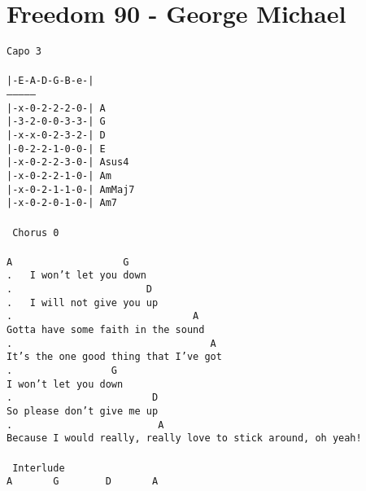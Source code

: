 \newpage
\section{Freedom 90 - George Michael}
\label{Freedom 90 - George Michael}
\texttt{Capo 3\\
\\
|-E-A-D-G-B-e-|\\
---------------\\
|-x-0-2-2-2-0-|\ A\\
|-3-2-0-0-3-3-|\ G\\
|-x-x-0-2-3-2-|\ D\\
|-0-2-2-1-0-0-|\ E\\
|-x-0-2-2-3-0-|\ Asus4\\
|-x-0-2-2-1-0-|\ Am\\
|-x-0-2-1-1-0-|\ AmMaj7\\
|-x-0-2-0-1-0-|\ Am7\\
\\
\lbrack\ Chorus\ 0\rbrack\\
\\
A\ \ \ \ \ \ \ \ \ \ \ \ \ \ \ \ \ \ \ G\\
. \ \ I\ won't\ let\ you\ down\\
. \ \ \ \ \ \ \ \ \ \ \ \ \ \ \ \ \ \ \ \ \ \ D\\
. \ \ I\ will\ not\ give\ you\ up\\
. \ \ \ \ \ \ \ \ \ \ \ \ \ \ \ \ \ \ \ \ \ \ \ \ \ \ \ \ \ \ A\\
Gotta\ have\ some\ faith\ in\ the\ sound\\
. \ \ \ \ \ \ \ \ \ \ \ \ \ \ \ \ \ \ \ \ \ \ \ \ \ \ \ \ \ \ \ \ \ A\ \ \\
It's\ the\ one\ good\ thing\ that\ I've\ got\\
. \ \ \ \ \ \ \ \ \ \ \ \ \ \ \ \ G\ \\
I\ won't\ let\ you\ down\\
. \ \ \ \ \ \ \ \ \ \ \ \ \ \ \ \ \ \ \ \ \ \ \ D\\
So\ please\ don't\ give\ me\ up\\
. \ \ \ \ \ \ \ \ \ \ \ \ \ \ \ \ \ \ \ \ \ \ \ \ A\ \ \ \ \ \ \ \ \ \ \ \ \ \ \ \ \ \ \ \ \ \ \ \ \ \ \ \ \ \\
Because\ I\ would\ really,\ really\ love\ to\ stick\ around,\ oh\ yeah!\\
\\
\lbrack\ Interlude\rbrack\\
A\ \ \ \ \ \ \ G\ \ \ \ \ \ \ \ D\ \ \ \ \ \ \ A\ \ \ \\
}
